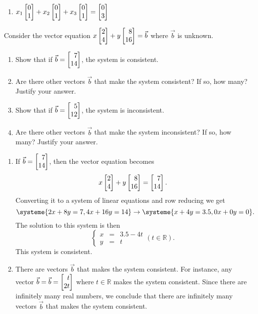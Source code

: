 \begin{exercises}
\begin{problist}
\begin{solution}
\begin{enumerate}
				\item $x_{1}\mat{0 \\ 1}+x_{2}\mat{0 \\ 1}+x_{3}\mat{0 \\ 1}=\mat
					{0 \\ 3}$
			\end{enumerate}
		\end{solution}

		\prob Consider the vector equation $x\mat{2 \\ 4}+y\mat{8 \\ 16}=\vec b$
		where $\vec b$ is unknown.
		\begin{enumerate}
			\item Show that if $\vec b=\mat{7 \\ 14}$, the system is consistent.

			\item Are there other vectors $\vec b$ that make the system consistent?
				If so, how many? Justify your answer.

			\item Show that if $\vec b=\mat{5 \\ 12}$, the system is
				inconsistent.

			\item Are there other vectors $\vec b$ that make the system inconsistent?
				If so, how many? Justify your answer.
		\end{enumerate}

		\begin{solution}
			\begin{enumerate}
				\item If $\vec b=\mat{7 \\ 14}$, then the vector equation
					becomes
					\[
						x\mat{2 \\ 4}+y\mat{8 \\ 16}=\mat{7 \\ 14}.
					\]
					Converting it to a system of linear equations and row
					reducing we get
					\[
						\systeme{2x+8y=7,4x+16y=14}\rightarrow \systeme{x+4y=3.5, 0x+0y=0}.
					\]
					The solution to this system is then
					\[
						\left\{
						\begin{array}
							{ccc} x & = & 3.5-4t \\ y & = & t
						\end{array}\right. (t\in \mathbb{R}).
					\]
					This system is consistent.

				\item There are vectors $\vec{b}$ that makes the system consistent.
					For instance, any vector $\vec b = \vec b=\mat{t \\ 2t}$ where
					$t\in\mathbb{R}$ makes the system consistent. Since there
					are infinitely many real numbers, we conclude that there are
					infinitely many vectors $\vec b$ that makes the system consistent.


\end{enumerate}
\end{solution}
\end{problist}
\end{exercises}

